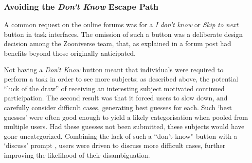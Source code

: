 \documentclass{sigchi}
\begin{document}


\subsubsection{Avoiding the \emph{Don't Know} Escape Path}
A common request on the online forums was for a \emph{I don't know} or \emph{Skip to next} button in task interfaces.  The omission of such a button was a deliberate design decision among the Zooniverse team, that, as explained in a forum post\cite{afron-blog-post} had benefits beyond those  originally anticipated.

Not having a \emph{Don't Know} button meant that individuals were required to perform a task in order to see more subjects; as described above, the  potential ``luck of the draw'' of receiving an interesting subject motivated continued participation.  The second result was that it forced users to slow down, and carefully consider difficult cases, generating best guesses for each.  Such `best guesses' were often good enough to yield a likely categorisation when pooled from multiple users.  Had these guesses not been submitted, these subjects would have gone uncategorized.  Combining the lack of such a ``don't know'' button with a  `discuss' prompt , users were driven to discuss more difficult cases, further improving the likelihood of their disambiguation.  %
\end{document}
